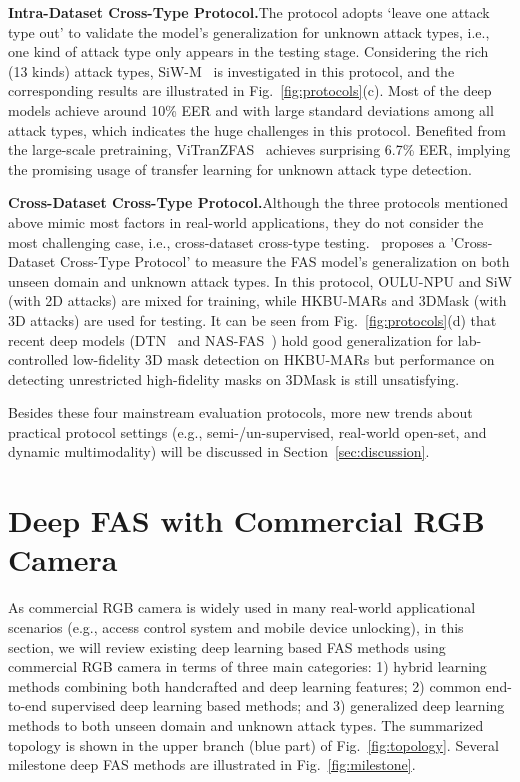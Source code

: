 \documentclass[10pt,journal,compsoc]{IEEEtran}
\begin{document}
\vspace{0.3em}

\noindent\textbf{Intra-Dataset Cross-Type Protocol.}\quad  The protocol adopts `leave one attack type out' to validate the model's generalization for unknown attack types, i.e., one kind of attack type only appears in the testing stage. Considering the rich (13 kinds) attack types, SiW-M~\cite{liu2019deep} is investigated in this protocol, and the corresponding results are illustrated in Fig.~\ref{fig:protocols}(c). Most of the deep models achieve around 10\% EER and with large standard deviations among all attack types, which indicates the huge challenges in this protocol. Benefited from the large-scale pretraining, ViTranZFAS~\cite{liu2019deep} achieves surprising 6.7\% EER, implying the promising usage of transfer learning for unknown attack type detection. 

\vspace{0.4em}

\noindent\textbf{Cross-Dataset Cross-Type Protocol.}\quad Although the three protocols mentioned above mimic most factors in real-world applications, they do not consider the most challenging case, i.e., cross-dataset cross-type testing.~\cite{yu2020fas2} proposes a 'Cross-Dataset Cross-Type Protocol' to measure the FAS model's generalization on both unseen domain and unknown attack types.
In this protocol, OULU-NPU and SiW (with 2D attacks) are mixed for training, while HKBU-MARs and 3DMask (with 3D attacks) are used for testing. It can be seen from Fig.~\ref{fig:protocols}(d) that recent deep models (DTN~\cite{liu2019deep} and NAS-FAS~\cite{yu2020fas2}) hold good generalization for lab-controlled low-fidelity 3D mask detection on HKBU-MARs but performance on detecting unrestricted high-fidelity masks on 3DMask is still unsatisfying.


Besides these four mainstream evaluation protocols, more new trends about practical protocol settings (e.g., semi-/un-supervised, real-world open-set, and dynamic multimodality) will be discussed in Section~\ref{sec:discussion}. 



\section{Deep FAS with Commercial RGB Camera} \label{sec:RGB}
As commercial RGB camera is widely used in many real-world applicational scenarios (e.g., access control system and mobile device unlocking), in this section, we will review existing deep learning based FAS methods using commercial RGB camera in terms of three main categories: 1) hybrid learning methods combining both handcrafted and deep learning features; 2) common end-to-end supervised deep learning based methods; and 3) generalized deep learning methods to both unseen domain and unknown attack types. The summarized topology is shown in the upper branch (blue part) of Fig.~\ref{fig:topology}. Several
milestone deep FAS methods are illustrated in Fig.~\ref{fig:milestone}. 
\end{document}
